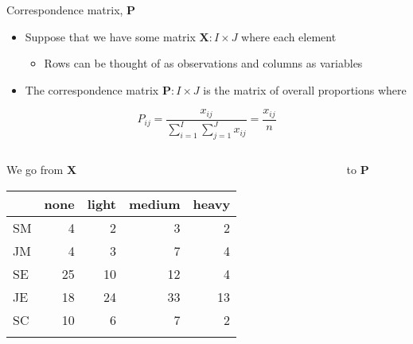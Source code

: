 \documentclass[
  ignorenonframetext,
  aspectratio=169]{beamer}
\providecommand{\tightlist}{%
  \setlength{\itemsep}{0pt}\setlength{\parskip}{0pt}}\usepackage{longtable,booktabs,array}
\begin{document}
\begin{frame}{Correspondence matrix, \(\symbf{P}\)}
\protect\hypertarget{correspondence-matrix-symbfp}{}
\begin{itemize}
\tightlist
\item
  Suppose that we have some matrix \(\symbf{X}:I \times J\) where each
  element

  \begin{itemize}
  \tightlist
  \item
    Rows can be thought of as observations and columns as variables
  \end{itemize}
\item
  The correspondence matrix \(\symbf{P}:I \times J\) is the matrix of
  overall proportions where
\end{itemize}

\[
P_{ij}= \frac{x_{ij}}{\sum_{i=1}^I \sum_{j=1}^J x_{ij}} = \frac{x_{ij}}{n}
\]

\begin{columns}[T]
\begin{column}{0.45\textwidth}
\begin{center} 

We go from $\symbf{X}$

\end{center}

\vspace{0.05cm}

\begin{longtable}[]{@{}lrrrr@{}}
\toprule\noalign{}
& none & light & medium & heavy \\
\midrule\noalign{}
\endhead
SM & 4 & 2 & 3 & 2 \\
JM & 4 & 3 & 7 & 4 \\
SE & 25 & 10 & 12 & 4 \\
JE & 18 & 24 & 33 & 13 \\
SC & 10 & 6 & 7 & 2 \\
\bottomrule\noalign{}
\end{longtable}
\end{column}

\begin{column}{0.025\textwidth}
\end{column}

\begin{column}{0.525\textwidth}
\begin{center}

to $\symbf{P}$

\end{center}


\end{column}
\end{columns}
\end{frame}
\end{document}
